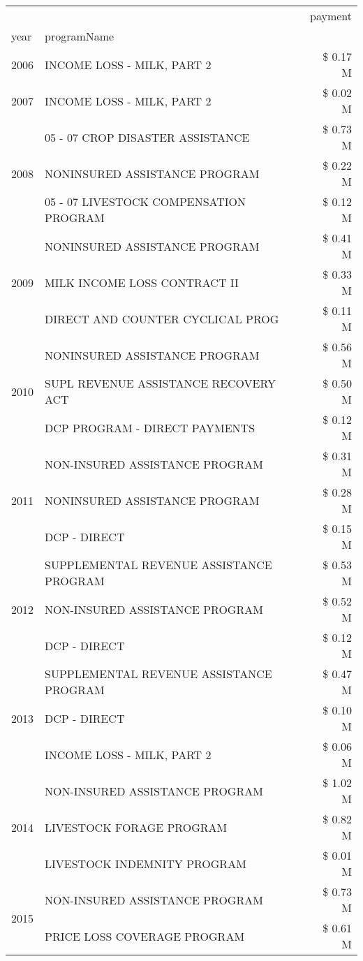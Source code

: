 \begin{tabular}{llr}
\toprule
 &  & payment \\
year & programName &  \\
\midrule
2006 & INCOME LOSS - MILK, PART 2 & \$ 0.17 M \\
\cline{1-3}
2007 & INCOME LOSS - MILK, PART 2 & \$ 0.02 M \\
\cline{1-3}
\multirow[t]{3}{*}{2008} & 05 - 07 CROP DISASTER ASSISTANCE & \$ 0.73 M \\
 & NONINSURED ASSISTANCE PROGRAM & \$ 0.22 M \\
 & 05 - 07 LIVESTOCK COMPENSATION PROGRAM & \$ 0.12 M \\
\cline{1-3}
\multirow[t]{3}{*}{2009} & NONINSURED ASSISTANCE PROGRAM & \$ 0.41 M \\
 & MILK INCOME LOSS CONTRACT II & \$ 0.33 M \\
 & DIRECT AND COUNTER CYCLICAL PROG & \$ 0.11 M \\
\cline{1-3}
\multirow[t]{3}{*}{2010} & NONINSURED ASSISTANCE PROGRAM & \$ 0.56 M \\
 & SUPL REVENUE ASSISTANCE RECOVERY ACT & \$ 0.50 M \\
 & DCP PROGRAM - DIRECT PAYMENTS & \$ 0.12 M \\
\cline{1-3}
\multirow[t]{3}{*}{2011} & NON-INSURED ASSISTANCE PROGRAM & \$ 0.31 M \\
 & NONINSURED ASSISTANCE PROGRAM & \$ 0.28 M \\
 & DCP - DIRECT & \$ 0.15 M \\
\cline{1-3}
\multirow[t]{3}{*}{2012} & SUPPLEMENTAL REVENUE ASSISTANCE PROGRAM & \$ 0.53 M \\
 & NON-INSURED ASSISTANCE PROGRAM & \$ 0.52 M \\
 & DCP - DIRECT & \$ 0.12 M \\
\cline{1-3}
\multirow[t]{3}{*}{2013} & SUPPLEMENTAL REVENUE ASSISTANCE PROGRAM & \$ 0.47 M \\
 & DCP - DIRECT & \$ 0.10 M \\
 & INCOME LOSS - MILK, PART 2 & \$ 0.06 M \\
\cline{1-3}
\multirow[t]{3}{*}{2014} & NON-INSURED ASSISTANCE PROGRAM & \$ 1.02 M \\
 & LIVESTOCK FORAGE PROGRAM & \$ 0.82 M \\
 & LIVESTOCK INDEMNITY PROGRAM & \$ 0.01 M \\
\cline{1-3}
\multirow[t]{3}{*}{2015} & NON-INSURED ASSISTANCE PROGRAM & \$ 0.73 M \\
 & PRICE LOSS COVERAGE PROGRAM & \$ 0.61 M \\

\end{tabular}
